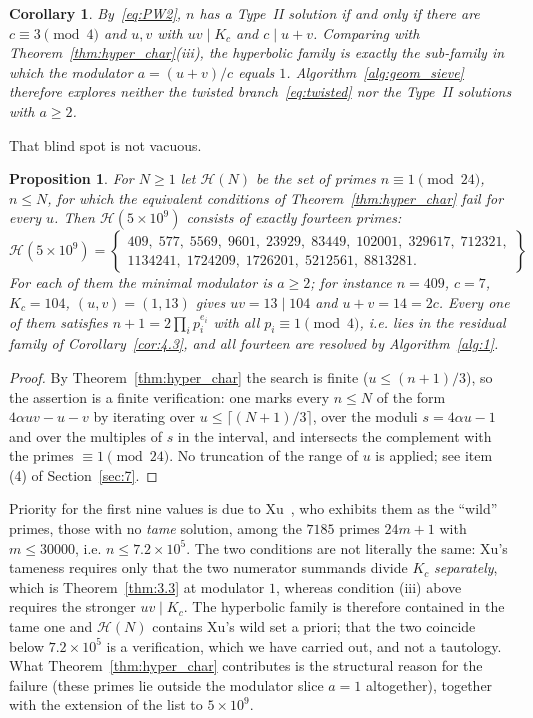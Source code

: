 \documentclass[11pt, a4paper]{article}
\theoremstyle{plain}
\newtheorem{corollary}[theorem]{Corollary}
\newtheorem{proposition}[theorem]{Proposition}
\theoremstyle{definition}
\begin{document}
\begin{corollary}\label{cor:proper_subfamily}
By~\eqref{eq:PW2}, $n$ has a Type~II solution if and only if there are $c\equiv3\pmod4$ and $u,v$ with $uv\mid K_c$ and $c\mid u+v$. Comparing with Theorem~\ref{thm:hyper_char}(iii), the hyperbolic family is exactly the sub-family in which the modulator $a=(u+v)/c$ equals $1$. Algorithm~\ref{alg:geom_sieve} therefore explores neither the twisted branch~\eqref{eq:twisted} nor the Type~II solutions with $a\ge2$.
\end{corollary}

That blind spot is not vacuous.

\begin{proposition}\label{prop:nine_primes}
For $N\ge1$ let $\mathcal{H}(N)$ be the set of primes $n\equiv1\pmod{24}$, $n\le N$, for which the equivalent conditions of Theorem~\ref{thm:hyper_char} fail \emph{for every} $u$. Then $\mathcal{H}(5\times10^{9})$ consists of exactly fourteen primes:
$$\mathcal{H}(5\times10^{9})=\left\{\begin{array}{l}409,\;577,\;5569,\;9601,\;23929,\;83449,\;102001,\;329617,\;712321,\\[2pt] 1134241,\;1724209,\;1726201,\;5212561,\;8813281.\end{array}\right\}$$
For each of them the minimal modulator is $a\ge2$; for instance $n=409$, $c=7$, $K_c=104$, $(u,v)=(1,13)$ gives $uv=13\mid104$ and $u+v=14=2c$. Every one of them satisfies $n+1=2\prod_i p_i^{e_i}$ with all $p_i\equiv1\pmod4$, i.e. lies in the residual family of Corollary~\ref{cor:4.3}, and all fourteen are resolved by Algorithm~\ref{alg:1}.
\end{proposition}
\begin{proof}
By Theorem~\ref{thm:hyper_char} the search is finite ($u\le (n+1)/3$), so the assertion is a finite verification: one marks every $n\le N$ of the form $4\alpha uv-u-v$ by iterating over $u\le\lceil(N+1)/3\rceil$, over the moduli $s=4\alpha u-1$ and over the multiples of $s$ in the interval, and intersects the complement with the primes $\equiv1\pmod{24}$. No truncation of the range of $u$ is applied; see item (4) of Section~\ref{sec:7}.
\end{proof}

Priority for the first nine values is due to Xu~\cite{xu2026}, who exhibits them as the ``wild'' primes, those with no \emph{tame} solution, among the $7185$ primes $24m+1$ with $m\le30000$, i.e. $n\le7.2\times10^{5}$. The two conditions are not literally the same: Xu's tameness requires only that the two numerator summands divide $K_c$ \emph{separately}, which is Theorem~\ref{thm:3.3} at modulator $1$, whereas condition (iii) above requires the stronger $uv\mid K_c$. The hyperbolic family is therefore contained in the tame one and $\mathcal{H}(N)$ contains Xu's wild set a priori; that the two coincide below $7.2\times10^{5}$ is a verification, which we have carried out, and not a tautology. What Theorem~\ref{thm:hyper_char} contributes is the structural reason for the failure (these primes lie outside the modulator slice $a=1$ altogether), together with the extension of the list to $5\times10^{9}$.
\end{document}
